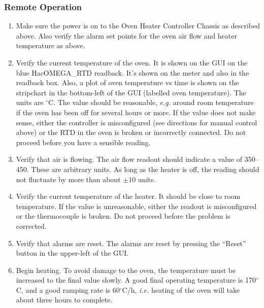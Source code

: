 \subsubsection{Remote Operation}
\begin{enumerate}
\item Make sure the power is on to the Oven Heater Controller
Chassis as described above.  Also verify the alarm set points
for the oven air flow and heater temperature as above.  
\item Verify the current temperature of the oven.  It is shown
on the GUI on the blue HacOMEGA\_RTD readback.  It's shown on 
the meter and also in the readback box.  Also, a plot of oven temperature
vs time is shown on the stripchart in the bottom-left of the GUI 
(labelled oven temperature).  The units are $^\circ$C. 
The value should be reasonable,  {\it e.g.}\/ around room temperature 
if the oven has been off for several hours or more. If the value 
does not make sense, either the controller is misconfigured (see 
directions for manual control above) or the RTD in the oven is 
broken or incorrectly connected.  Do not proceed before you have 
a sensible reading.
\item Verify that air is flowing. The air flow readout should indicate
  a value of 350--450. These are arbitrary units. As long as the heater is
  off, the reading should not fluctuate by more than about $\pm 10$ units.
\item Verify the current temperature of the heater. It should be
  close to room temperature. If the value is unreasonable, either
  the readout is misconfigured or the thermocouple is broken.
  Do not proceed before the problem is corrected.
\item Verify that alarms are reset.  The alarms are reset by pressing
the ``Reset'' button in the upper-left of the GUI.  
\item Begin heating.  To avoid damage to the oven, the temperature 
must be increased to the final value slowly. A good final operating 
temperature is 170$^\circ$C, and a good ramping rate is 60$^\circ$C/h, 
{\it i.e.\/} heating of the oven will take about three hours to complete.


\end{enumerate}
